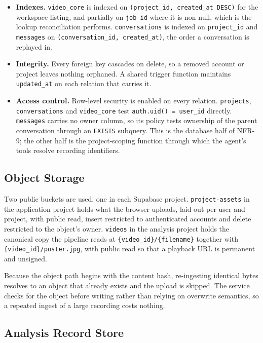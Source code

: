 \begin{itemize}
  \item \textbf{Indexes.} \texttt{video\_core} is indexed on
        \texttt{(project\_id, created\_at DESC)} for the workspace listing, and partially
        on \texttt{job\_id} where it is non-null, which is the lookup reconciliation
        performs. \texttt{conversations} is indexed on \texttt{project\_id} and
        \texttt{messages} on \texttt{(conversation\_id, created\_at)}, the order a
        conversation is replayed in.
  \item \textbf{Integrity.} Every foreign key cascades on delete, so a removed account or
        project leaves nothing orphaned. A shared trigger function maintains
        \texttt{updated\_at} on each relation that carries it.
  \item \textbf{Access control.} Row-level security is enabled on every relation.
        \texttt{projects}, \texttt{conversations} and \texttt{video\_core} test
        \texttt{auth.uid() = user\_id} directly. \texttt{messages} carries no owner
        column, so its policy tests ownership of the parent conversation through an
        \texttt{EXISTS} subquery. This is the database half of NFR-9; the other half is
        the project-scoping function through which the agent's tools resolve recording
        identifiers.
\end{itemize}

\subsection{Object Storage}

Two public buckets are used, one in each Supabase project. \texttt{project-assets} in the
application project holds what the browser uploads, laid out per user and project, with
public read, insert restricted to authenticated accounts and delete restricted to the
object's owner. \texttt{videos} in the analysis project holds the canonical copy the
pipeline reads at \texttt{\{video\_id\}/\{filename\}} together with
\texttt{\{video\_id\}/poster.jpg}, with public read so that a playback URL is permanent
and unsigned.

Because the object path begins with the content hash, re-ingesting identical bytes
resolves to an object that already exists and the upload is skipped. The service checks
for the object before writing rather than relying on overwrite semantics, so a repeated
ingest of a large recording costs nothing.

\subsection{Analysis Record Store}

